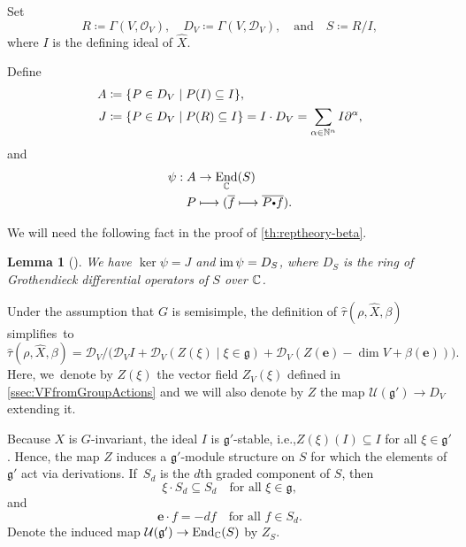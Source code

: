 \documentclass[11pt]{article}
\newcommand{\ie}{i.e.,\xspace}
\newcommand\mto{\mathchoice{\longmapsto}{\mapsto}{\mapsto}{\mapsto}}
\newcommand{\sbullet}{{\scriptscriptstyle\bullet}}
\newcommand{\csbullet}{{\raisebox{1pt}{$\sbullet$}}}
\newcommand{\quand}{\quad\text{and}\quad}
\newcommand{\bme}{{\boldsymbol{e}}}
\newtheorem{lem}[thm]{Lemma}
\newcommand{\frg}{\mathfrak{g}}
\DeclareMathOperator{\End}{\textup{End}}
\DeclareMathOperator{\im}{\textup{im}}
\begin{document}
Set
\[
R\coloneqq \Gamma(V, \mathcal{O}_V), \quad D_V \coloneqq \Gamma(V, \mathscr{D}_V),\quand S\coloneqq R/I,
\]
where $I$ is the defining ideal of $\hat{X}$.

Define
\begin{equation}\label{eq:subAlg}
\begin{aligned}
A &\coloneqq \{P\in D_V \mid P(I) \subseteq I\},\\
J &\coloneqq \{P\in D_V \mid P(R) \subseteq I\} = I\cdot D_V=\sum_{\alpha\in \N^n} I\partial^\alpha,\\
\end{aligned}
\end{equation}
and
\begin{equation}\label{eq:MapPsi}
\begin{aligned}
\psi:A&\to\End_\C(S) \\
P&\mto(\overline{f}\mto\overline{P\csbullet f}).
\end{aligned}
\end{equation}

We will need the following fact in the proof of \cref{th:reptheory-beta}.

\begin{lem}[{\cite[Prop.\,1.6.]{SmithStafford}}]\label{milicic-ker}
We have $\ker\psi=J$ and $\im\psi=D_S$, where $D_S$ is the ring of Grothendieck differential operators of $S$ over ${\mathbb C}$.
\end{lem}

Under the assumption that $G$ is semisimple, the definition of $\hat\tau(\rho, \hat{X},\beta)$ simplifies~to
\[
\hat\tau(\rho, \hat{X}, \beta) = \mathscr{D}_V/\bigl(\mathscr{D}_VI + \mathscr{D}_V(Z(\xi) \mid \xi \in \mathfrak{g}) + \mathscr{D}_V(Z(\bme)-\dim V + \beta(\bme))\bigr).
\]
Here, we~denote by $Z(\xi)$ the vector field $Z_V(\xi)$ defined in \cref{ssec:VFfromGroupActions} and we will also denote by $Z$ the map $\mathcal U(\frg') \to D_V$ extending it.

Because $X$ is $G$-invariant, the ideal $I$ is $\mathfrak{g}'$-stable, \ie $Z(\xi)(I)\subseteq I$ for all $\xi\in \mathfrak{g}'$. Hence, the map $Z$ induces a $\mathfrak{g}'$\nobreakdash-mod\-ule structure on $S$ for which the elements of $\mathfrak{g}'$ act via derivations. If~$S_d$ is the $d$th graded component of $S$, then
\[
\xi\cdot S_d \subseteq S_d \quad \text{for all }\xi \in \mathfrak{g},
\]
and
\begin{equation}\label{eq:eul-scales}
\bme\cdot f = -df\quad\text{for all }f\in S_d.
\end{equation}
Denote the induced map $\mathcal{U}(\mathfrak{g}') \to \End_\C(S)$ by $Z_S$.
\end{document}
